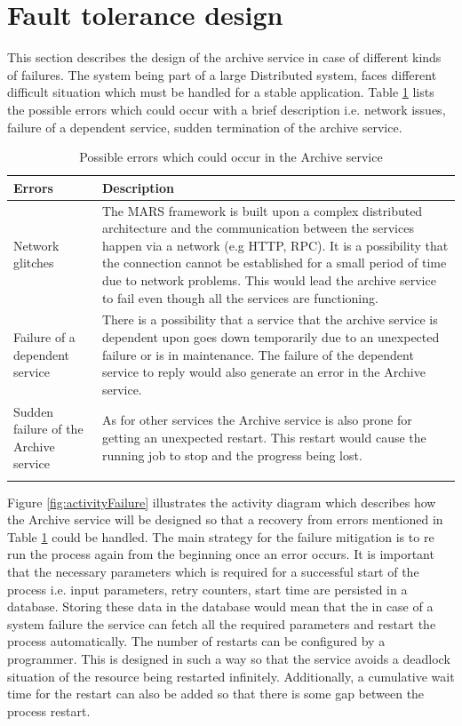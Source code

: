 \newpage
\section{Fault tolerance design}
This section describes the design of the archive service in case of different kinds of failures. The system being part of a large Distributed system,
faces different difficult situation which must be handled for a stable application. Table \ref{table:probServices} lists the possible errors which 
could occur with a brief description i.e. network issues, failure of a 
dependent service, sudden termination of the archive service. 
\begin{longtable}{|p{4cm}|p{10cm}|}
    \hline
        \textbf{Errors}  & \textbf{Description}\\
    \hline
        Network glitches & The MARS framework is built upon a complex distributed architecture and the communication between the services
        happen via a network (e.g HTTP, RPC). It is a possibility that the connection cannot be established for a small period of time due to network problems.
        This would lead the archive service to fail even though all the services are functioning.\\
    \hline
        Failure of a dependent service & There is a possibility that a service that the archive service is dependent upon goes down temporarily due to an unexpected
        failure or is in maintenance. The failure of the dependent service to reply would also generate an error in the Archive service.\\
    \hline
        Sudden failure of the Archive service & As for other services the Archive service is also prone for getting an unexpected restart. This restart would cause
        the running job to stop and the progress being lost.\\    
    \hline
    \caption{Possible errors which could occur in the Archive service}
    \label{table:probServices} 
\end{longtable}

Figure \ref{fig:activityFailure} illustrates the activity diagram which describes how the Archive service will be designed so that a recovery from errors mentioned in
Table \ref{table:probServices} could be handled. The main strategy for the failure mitigation is to re run the process again from the beginning once an error occurs. 
It is important that the necessary parameters which is required for a successful start of the process i.e. input parameters, retry counters, start time are persisted
in a database. Storing these data in the database would mean that the in case of a system failure the service can fetch all the required parameters and restart the 
process automatically. The number of restarts can be configured by a programmer. This is designed in such a way so that the service avoids a deadlock situation of the
resource being restarted infinitely. Additionally, a cumulative wait time for the restart can also be added so that there is some gap between the process restart.

